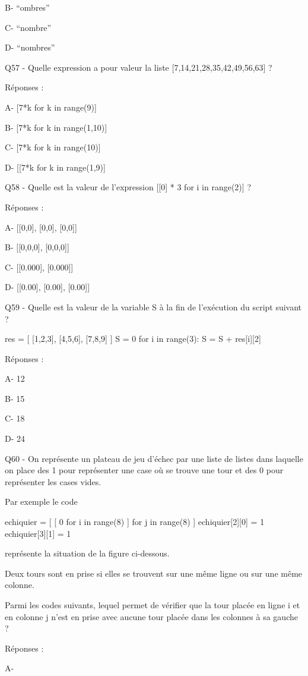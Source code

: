 \documentclass[
]{book}
\begin{document}
B- ``ombres''

C- ``nombre''

D- ``nombres''

Q57 - Quelle expression a pour valeur la liste {[}7,14,21,28,35,42,49,56,63{]} ?

Réponses :

A- {[}7*k for k in range(9){]}

B- {[}7*k for k in range(1,10){]}

C- {[}7*k for k in range(10){]}

D- {[}{[}7*k for k in range(1,9){]}

Q58 - Quelle est la valeur de l'expression {[}{[}0{]} * 3 for i in range(2){]} ?

Réponses :

A- {[}{[}0,0{]}, {[}0,0{]}, {[}0,0{]}{]}

B- {[}{[}0,0,0{]}, {[}0,0,0{]}{]}

C- {[}{[}0.000{]}, {[}0.000{]}{]}

D- {[}{[}0.00{]}, {[}0.00{]}, {[}0.00{]}{]}

Q59 - Quelle est la valeur de la variable S à la fin de l'exécution du script suivant ?

res = {[} {[}1,2,3{]}, {[}4,5,6{]}, {[}7,8,9{]} {]}
S = 0
for i in range(3):
S = S + res{[}i{]}{[}2{]}

Réponses :

A- 12

B- 15

C- 18

D- 24

Q60 - On représente un plateau de jeu d'échec par une liste de listes dans laquelle on place des 1 pour représenter une case où se trouve une tour et des 0 pour représenter les cases vides.

Par exemple le code

echiquier = {[} {[} 0 for i in range(8) {]} for j in range(8) {]}
echiquier{[}2{]}{[}0{]} = 1
echiquier{[}3{]}{[}1{]} = 1

représente la situation de la figure ci-dessous.

Deux tours sont en prise si elles se trouvent sur une même ligne ou sur une même colonne.

Parmi les codes suivants, lequel permet de vérifier que la tour placée en ligne i et en colonne j n'est en prise avec aucune tour placée dans les colonnes à sa gauche ?

Réponses :

A-
\end{document}
